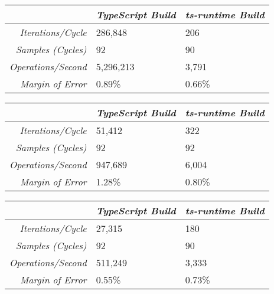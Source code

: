 \begin{center}
{
\centering
\tabulinesep=1.2mm
\setlength{\tabcolsep}{5mm}
\def\arraystretch{1.25}
\small
\begin{tabu} to \textwidth {|r||X[c,m]|X[c,m]|}
  \hline
  & \emph{TypeScript Build} & \emph{ts-runtime Build} \\
  \hline
  \hline
  \emph{Iterations/Cycle}  & 286,848 & 206 \\
  \hline
  \emph{Samples (Cycles)}  & 92 & 90 \\
  \hline
  \emph{Operations/Second} & 5,296,213 & 3,791 \\
  \hline
  \emph{Margin of Error}   & 0.89\% & 0.66\% \\
  \hline
\end{tabu}
}
\end{center}

\begin{center}
{
\centering
\tabulinesep=1.2mm
\setlength{\tabcolsep}{5mm}
\def\arraystretch{1.25}
\small
\begin{tabu} to \textwidth {|r||X[c,m]|X[c,m]|}
  \hline
  & \emph{TypeScript Build} & \emph{ts-runtime Build} \\
  \hline
  \hline
  \emph{Iterations/Cycle}  & 51,412 & 322 \\
  \hline
  \emph{Samples (Cycles)}  & 92 & 92 \\
  \hline
  \emph{Operations/Second} & 947,689 & 6,004 \\
  \hline
  \emph{Margin of Error}   & 1.28\% & 0.80\% \\
  \hline
\end{tabu}
}
\end{center}

\begin{center}
{
\centering
\tabulinesep=1.2mm
\setlength{\tabcolsep}{5mm}
\def\arraystretch{1.25}
\small
\begin{tabu} to \textwidth {|r||X[c,m]|X[c,m]|}
  \hline
  & \emph{TypeScript Build} & \emph{ts-runtime Build} \\
  \hline
  \hline
  \emph{Iterations/Cycle}  & 27,315 & 180 \\
  \hline
  \emph{Samples (Cycles)}  & 92 & 90 \\
  \hline
  \emph{Operations/Second} & 511,249 & 3,333 \\
  \hline
  \emph{Margin of Error}   & 0.55\% & 0.73\% \\
  \hline
\end{tabu}
}
\end{center}

